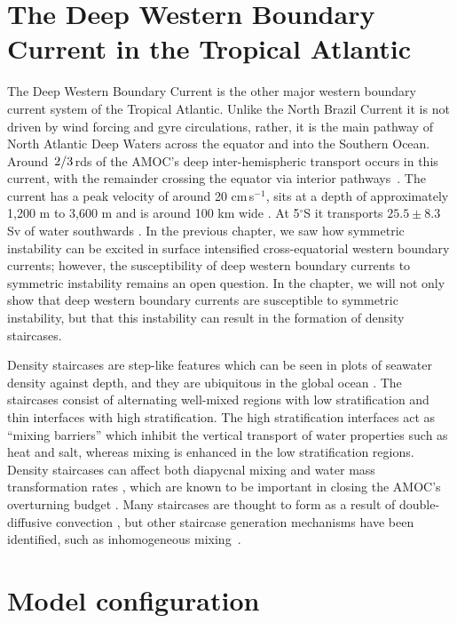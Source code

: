 \section{The Deep Western Boundary Current in the Tropical Atlantic}
\label{sec:DWBCIntro}
The Deep Western Boundary Current is the other major western boundary current system of the Tropical Atlantic. Unlike the North Brazil Current it is not driven by wind forcing and gyre circulations, rather, it is the main pathway of North Atlantic Deep Waters across the equator and into the Southern Ocean. Around $\flatfrac{2}{3}$rds of the AMOC's deep inter-hemispheric transport occurs in this current, with the remainder crossing the equator via interior pathways~\citep{Arhan1998, Bower2019}. The current has a peak velocity of around 20 cm\,s$^{-1}$, sits at a depth of approximately 1,200 m to 3,600 m and is around 100 km wide \citep{Rhein1995}. At 5$^\circ$S it transports $25.5\pm8.3$ Sv of water southwards \citep{Schott2005}. In the previous chapter, we saw how symmetric instability can be excited in surface intensified cross-equatorial western boundary currents; however, the susceptibility of deep western boundary currents to symmetric instability remains an open question. In the chapter, we will not only show that deep western boundary currents are susceptible to symmetric instability, but that this instability can result in the formation of density staircases.

Density staircases are step-like features which can be seen in plots of seawater density against depth, and they are ubiquitous in the global ocean \citep{Stern1960, Tait1968, Johannessen1974, Lambert1977, Melling1984, Schmitt1987}. The staircases consist of alternating well-mixed regions with low stratification and thin interfaces with high stratification. The high stratification interfaces act as ``mixing barriers'' which inhibit the vertical transport of water properties such as heat and salt, whereas mixing is enhanced in the low stratification regions. Density staircases can affect both diapycnal mixing and water mass transformation rates \citep{Schmitt2005}, which are known to be important in closing the AMOC's overturning budget \citep{DeLavergne2022}. Many staircases are thought to form as a result of double-diffusive convection \citep{Merryfield2000}, but other staircase generation mechanisms have been identified, such as inhomogeneous mixing~\citep{Balmforth1998}.



\section{Model configuration}
\label{sec:methods}

